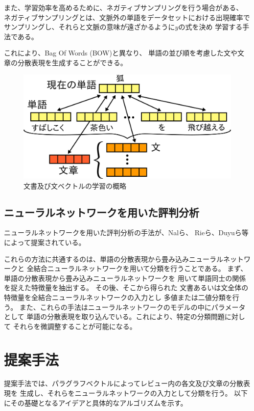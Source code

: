\documentclass[twocolumn,a4paper]{ltjarticle}
\makeatletter
\let\tti@includegraphics\includegraphics
\renewcommand{\includegraphics}[1]{%
    \tti@includegraphics[width=\linewidth]{#1}}
\makeatother
\begin{document}
また、学習効率を高めるために、ネガティブサンプリングを行う場合がある、
ネガティブサンプリングとは、文脈外の単語をデータセットにおける出現確率で
サンプリングし、それらと文脈の意味が遠ざかるように$y$の式を決め
学習する手法である。

これにより、Bag Of Words (BOW)と異なり、
単語の並び順を考慮した文や文章の分散表現を生成することができる。

\begin{figure}
  \includegraphics{fig/dvsvwv.png}
  \caption{文書及び文ベクトルの学習の概略}
  \label{fig:ParagraphVector}
\end{figure}


\subsection{ニューラルネットワークを用いた評判分析}

ニューラルネットワークを用いた評判分析の手法が、Nalら\cite{nal14}、
Rieら\cite{rie14}、Duyuら\cite{duyu15}等によって提案されている。

これらの方法に共通するのは、単語の分散表現から畳み込みニューラルネットワークと
全結合ニューラルネットワークを用いて分類を行うことである。
まず、単語の分散表現から畳み込みニューラルネットワークを
用いて単語同士の関係を捉えた特徴量を抽出する。
その後、そこから得られた
文書あるいは文全体の特徴量を全結合ニューラルネットワークの入力とし
多値または二値分類を行う。
また、これらの手法はニューラルネットワークのモデルの中にパラメータとして
単語の分散表現を取り込んでいる。これにより、特定の分類問題に対して
それらを微調整することが可能になる。



\section{提案手法}

提案手法では、パラグラフベクトルによってレビュー内の各文及び文章の分散表現を
生成し、それらをニューラルネットワークの入力として分類を行う。
以下にその基礎となるアイデアと具体的なアルゴリズムを示す。
\end{document}
